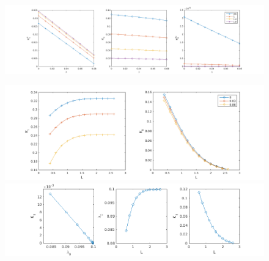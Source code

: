 \documentclass{article}
\begin{document}
\begin{figure}[!ht]\centering
\includegraphics[scale=0.6,angle=90]{KI-KII-lambda.png}
\end{figure}
\begin{figure}[!ht]\centering
\includegraphics[scale=0.6]{KI-KII-L.png}
\includegraphics[scale=0.8,angle=90]{KI-0.png}
\end{figure}
\end{document}

